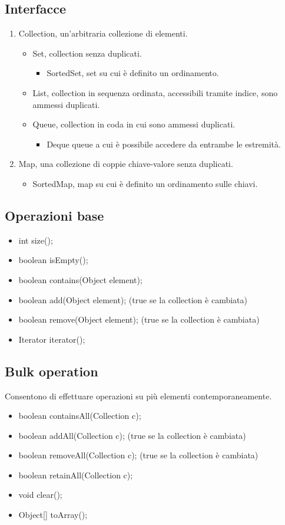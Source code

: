 \subsection{Interfacce}
\begin{enumerate}
\item Collection, un'arbitraria collezione di elementi.
\begin{itemize}
\item Set, collection senza duplicati.
\begin{itemize}
\item SortedSet, set su cui \`e definito un ordinamento.
\end{itemize}
\item List, collection in sequenza ordinata, accessibili tramite indice, sono ammessi duplicati.
\item Queue, collection in coda in cui sono ammessi duplicati.
\begin{itemize}
\item Deque queue a cui \`e possibile accedere da entrambe le estremit\`a.
\end{itemize}
\end{itemize}
\item Map, una collezione di coppie chiave-valore senza duplicati.
\begin{itemize}
\item SortedMap, map su cui \`e definito un ordinamento sulle chiavi. 
\end{itemize}
\end{enumerate}
\subsection{Operazioni base}
\begin{itemize}
\item int size();
\item boolean isEmpty();
\item boolean contains(Object element); 
\item boolean add(Object element); (true se la collection \`e cambiata)
\item boolean remove(Object element); (true se la collection \`e cambiata)
\item Iterator iterator();
\end{itemize}
\subsection{Bulk operation}
Consentono di effettuare operazioni su pi\`u elementi contemporaneamente.
\begin{itemize}
\item boolean containsAll(Collection c); 
\item boolean addAll(Collection c); (true se la collection \`e cambiata)
\item boolean removeAll(Collection c); (true se la collection \`e cambiata)
\item boolean retainAll(Collection c);
\item void clear();
\item Object[] toArray();
\end{itemize}
